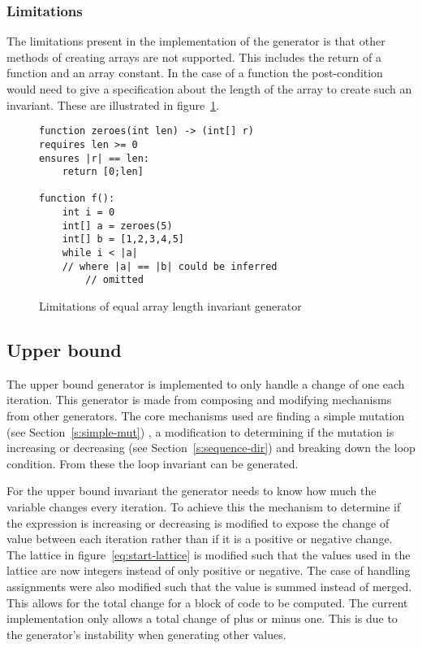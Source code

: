 \subsubsection{Limitations}

The limitations present in the implementation of the generator is
that other methods of creating arrays are not supported.
This includes the return of a function and an array constant.
In the case of a function the post-condition would need to
give a specification about the length of the array to create
such an invariant.
These are illustrated in figure~\ref{lst:whiley-length-limit}.

\begin{figure}
\begin{lstlisting}
function zeroes(int len) -> (int[] r)
requires len >= 0
ensures |r| == len:
    return [0;len]

function f():
    int i = 0
    int[] a = zeroes(5)
    int[] b = [1,2,3,4,5]
    while i < |a|
    // where |a| == |b| could be inferred
        // omitted
\end{lstlisting}
\caption{Limitations of equal array length invariant generator}
\label{lst:whiley-length-limit}
\end{figure}

\subsection{Upper bound}

The upper bound generator is implemented to only handle a change of one each iteration.
This generator is made from composing and modifying mechanisms from other generators.
The core mechanisms used are finding a simple mutation (see Section~\ref{s:simple-mut}) ,
a modification to determining if the mutation is increasing or decreasing (see Section~\ref{s:sequence-dir})
and breaking down the loop condition.
From these the loop invariant can be generated.

For the upper bound invariant the generator needs to know how much the variable changes
every iteration. 
To achieve this the mechanism to determine if the expression is increasing or decreasing is
modified to expose the change of value between each iteration rather than if it is a positive or
negative change.
The lattice in figure~\ref{eq:start-lattice} is modified such that the values used in the lattice
are now integers instead of only positive or negative.
The case of handling assignments were also modified such that the value is summed instead of merged.
This allows for the total change for a block of code to be computed.
The current implementation only allows a total change of plus or minus one.
This is due to the generator's instability when generating other values.

